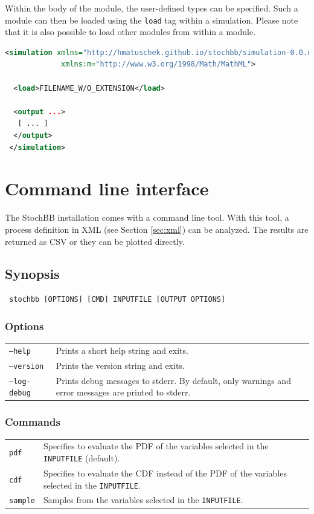 \documentclass[a4paper, 10pt]{paper}
\newcommand{\code}[1]{\texttt{#1}}
\begin{document}
Within the body of the module, the user-defined types can be specified. Such a module can then
be loaded using the \code{load} tag within a simulation. Please note that it is also possible to
load other modules from within a module.

\begin{lstlisting}[language=XML]
 <simulation xmlns="http://hmatuschek.github.io/stochbb/simulation-0.0.dtd"
             xmlns:m="http://www.w3.org/1998/Math/MathML">

  <load>FILENAME_W/O_EXTENSION</load>

  <output ...>
   [ ... ]
  </output>
 </simulation>
\end{lstlisting}


\section{Command line interface} \label{sec:cli}
The StochBB installation comes with a command line tool. With this tool, a process definition
in XML (see Section \ref{sec:xml}) can be analyzed. The results are returned as CSV or they can be plotted
directly.

\subsection{Synopsis}
\begin{lstlisting}
 stochbb [OPTIONS] [CMD] INPUTFILE [OUTPUT OPTIONS]
\end{lstlisting}

\subsubsection{Options}
\begin{tabular}{p{}p{}}
 \code{--help} & Prints a short help string and exits. \\
 \code{--version} & Prints the version string and exits. \\
 \code{--log-debug} &Prints debug messages to stderr. By default, only warnings and error messages
  are printed to stderr. 
\end{tabular}

\subsubsection{Commands}
\begin{tabular}{p{}p{}}
 \code{pdf} & Specifies to evaluate the PDF of the variables selected in the \code{INPUTFILE} (default). \\
 \code{cdf} & Specifies to evaluate the CDF instead of the PDF of the variables selected in the
  \code{INPUTFILE}. \\
 \code{sample} & Samples from the variables selected in the \code{INPUTFILE}.
\end{tabular}
\end{document}
